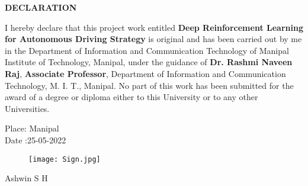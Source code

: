 \begin{center}
\large{\textbf{DECLARATION}}\\
\vspace{1cm}
\end{center}

I hereby declare that this project work entitled \textbf{Deep Reinforcement Learning for Autonomous Driving Strategy} is original and has been carried out by
me in the Department of Information and Communication Technology of Manipal Institute of Technology, Manipal, under the guidance of \textbf{Dr. Rashmi Naveen Raj}, \textbf{Associate Professor}, Department of Information and Communication Technology, M. I. T., Manipal. No part of this work has been submitted for the award of a degree or diploma either to this University or to any other Universities.



\vspace{2cm}

\begin{flushleft}
Place: Manipal\\
Date :25-05-2022
\end{flushleft}


\begin{flushright}

\begin{figure}[h]
	\hfill\texttt{[image: Sign.jpg]}
	\label{fig:sign}
\end{figure} 
Ashwin S H\\

\end{flushright}

